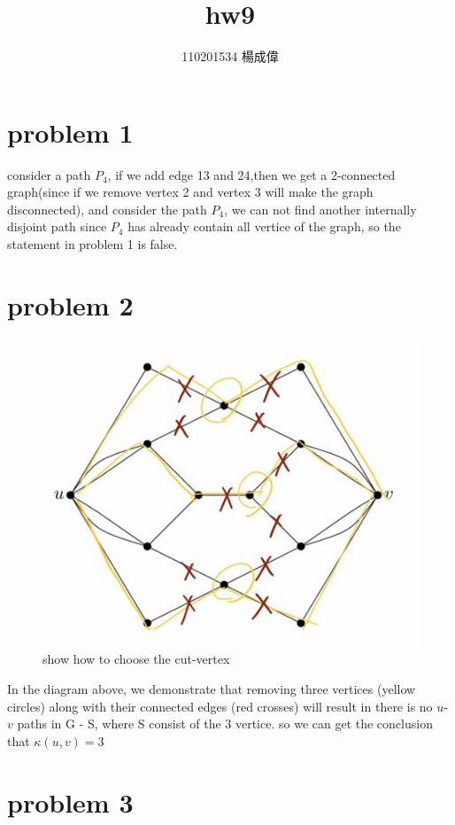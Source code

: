 \documentclass{article}
\title{hw9}
\author{110201534 楊成偉}
\date{}
\begin{document}
\begin{CJK*}{UTF8}{bkai}
\maketitle

\section*{problem 1}
consider a path $P_{4}$, if we add edge 13 and 24,then we get a 2-connected graph(since if we remove vertex 2 and vertex 3 will make the graph disconnected), and consider the path $P_{4}$, we can not find another internally disjoint path since $P_{4}$ has already contain all vertice of the graph, so the statement in problem 1 is false.

\section*{problem 2}
\begin{figure}[H]
    \centering
    \includegraphics[scale = 0.3]{hw9.jpg}
    \caption{show how to choose the cut-vertex}
\end{figure}
In the diagram above, we demonstrate that removing three vertices (yellow circles) along with their connected edges (red crosses) will result in there is no \( u \)-\( v \) paths in G - S, where S consist of the 3 vertice.
so we can get the conclusion that $\kappa(u,v) = 3$
\section*{problem 3}

\end{CJK*}
\end{document}
